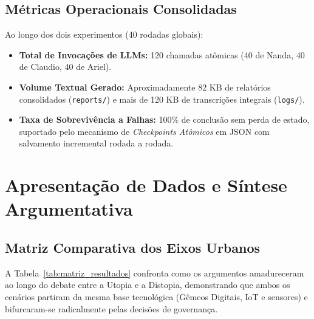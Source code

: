 \documentclass[runningheads]{llncs}
\begin{document}
\subsection{M\'etricas Operacionais Consolidadas}

Ao longo dos dois experimentos (40 rodadas globais):
\begin{itemize}
    \item \textbf{Total de Invoca\c{c}\~oes de LLMs:} 120 chamadas at\^omicas (40 de Nanda, 40 de Claudio, 40 de Ariel).
    \item \textbf{Volume Textual Gerado:} Aproximadamente 82 KB de relat\'orios consolidados (\texttt{reports/}) e mais de 120 KB de transcri\c{c}\~oes integrais (\texttt{logs/}).
    \item \textbf{Taxa de Sobreviv\^encia a Falhas:} 100\% de conclus\~ao sem perda de estado, suportado pelo mecanismo de \emph{Checkpoints At\^omicos} em JSON com salvamento incremental rodada a rodada.
\end{itemize}

\section{Apresenta\c{c}\~ao de Dados e S\'intese Argumentativa}

\subsection{Matriz Comparativa dos Eixos Urbanos}

A Tabela~\ref{tab:matriz_resultados} confronta como os argumentos amadureceram ao longo do debate entre a Utopia e a Distopia, demonstrando que ambos os cen\'arios partiram da mesma base tecnol\'ogica (G\^emeos Digitais, IoT e sensores) e bifurcaram-se radicalmente pelas decis\~oes de governan\c{c}a.
\end{document}

